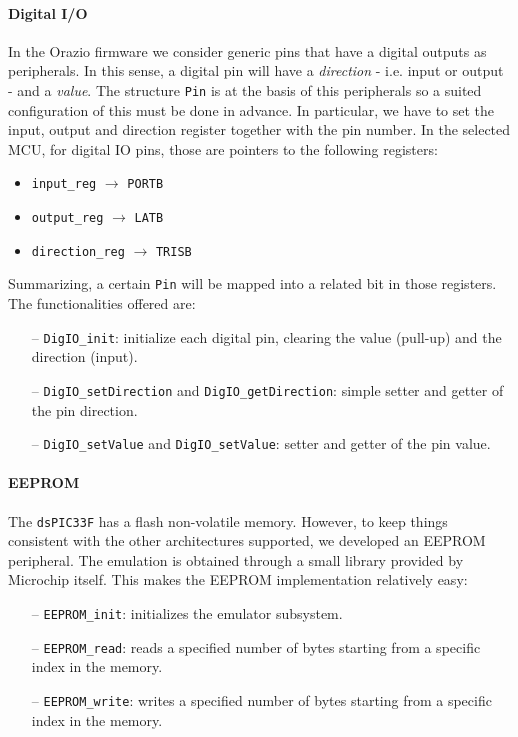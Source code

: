\documentclass[10pt,a4paper, notitlepage]{report}
\begin{document}
\paragraph{Digital I/O} In the Orazio firmware we consider generic pins that have a digital outputs as peripherals. In this sense, a digital pin will have a \textit{direction} - i.e. input or output - and a \textit{value}. The structure \texttt{Pin} is at the basis of this peripherals so a suited configuration of this must be done in advance. In particular, we have to set the input, output and direction register together with the pin number. In the selected MCU, for digital IO pins, those are pointers to the following registers:
\begin{itemize}
  \item \texttt{input\_reg} $\rightarrow$ \texttt{PORTB}
  \item \texttt{output\_reg} $\rightarrow$ \texttt{LATB}
  \item \texttt{direction\_reg} $\rightarrow$ \texttt{TRISB}
\end{itemize}
Summarizing, a certain \texttt{Pin} will be mapped into a related bit in those registers. The functionalities offered are:
\begin{itemize}
  \item[--] \texttt{DigIO\_init}: initialize each digital pin, clearing the value (pull-up) and the direction (input).
  \item[--] \texttt{DigIO\_setDirection} and \texttt{DigIO\_getDirection}: simple setter and getter of the pin direction.
  \item[--] \texttt{DigIO\_setValue} and \texttt{DigIO\_setValue}: setter and getter of the pin value.
\end{itemize}
\paragraph{EEPROM} The \texttt{dsPIC33F} has a flash non-volatile memory. However, to keep things consistent with the other architectures supported, we developed an EEPROM peripheral. The emulation is obtained through a small library provided by Microchip itself. This makes the EEPROM implementation relatively easy:
\begin{itemize}
  \item[--] \texttt{EEPROM\_init}: initializes the emulator subsystem.
  \item[--] \texttt{EEPROM\_read}: reads a specified number of bytes starting from a specific index in the memory.
  \item[--] \texttt{EEPROM\_write}: writes a specified number of bytes starting from a specific index in the memory.
\end{itemize}
\end{document}
